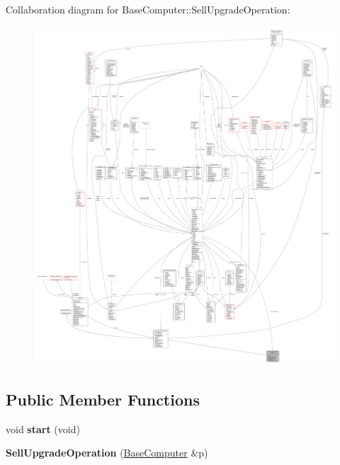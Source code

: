 Collaboration diagram for Base\+Computer\+:\+:Sell\+Upgrade\+Operation\+:
\nopagebreak
\begin{figure}[H]
\begin{center}
\leavevmode
\includegraphics[width=350pt]{d6/d94/classBaseComputer_1_1SellUpgradeOperation__coll__graph}
\end{center}
\end{figure}
\subsection*{Public Member Functions}
\begin{DoxyCompactItemize}
\item 
void {\bfseries start} (void)\hypertarget{classBaseComputer_1_1SellUpgradeOperation_a49486fa93c29b431b99318fc082bdf61}{}\label{classBaseComputer_1_1SellUpgradeOperation_a49486fa93c29b431b99318fc082bdf61}

\item 
{\bfseries Sell\+Upgrade\+Operation} (\hyperlink{classBaseComputer}{Base\+Computer} \&p)\hypertarget{classBaseComputer_1_1SellUpgradeOperation_a8c547b8b168c32c94ec84173429dbc53}{}\label{classBaseComputer_1_1SellUpgradeOperation_a8c547b8b168c32c94ec84173429dbc53}

\end{DoxyCompactItemize}
